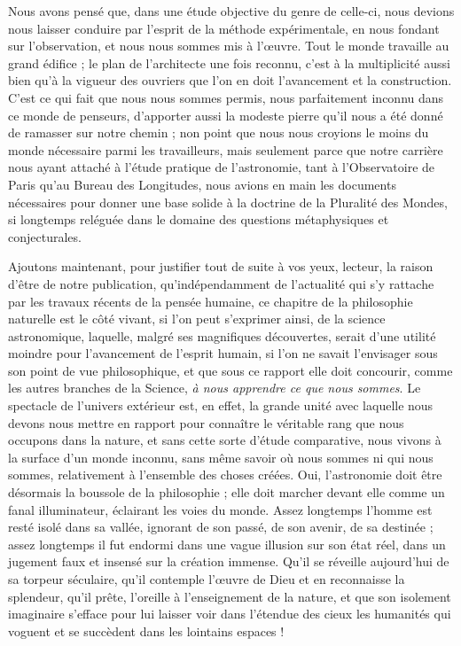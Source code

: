 \documentclass[a4paper, 11pt, oneside, landscape]{article}
\begin{document}
Nous avons pensé que, dans une étude objective du genre de celle-ci, nous devions nous laisser conduire par l'esprit de la méthode expérimentale, en nous fondant sur l'observation, et nous nous sommes mis à l'œuvre. Tout le monde travaille au grand édifice ; le plan de l'architecte une fois reconnu, c'est à la multiplicité aussi bien qu'à la vigueur des ouvriers que l'on en doit l'avancement et la construction. C'est ce qui fait que nous nous sommes permis, nous parfaitement inconnu dans ce monde de penseurs, d'apporter aussi la modeste pierre qu'il nous a été donné de ramasser sur notre chemin ; non point que nous nous croyions le moins du monde nécessaire parmi les travailleurs, mais seulement parce que notre carrière nous ayant attaché à l'étude pratique de l'astronomie, tant à l'Observatoire de Paris qu'au Bureau des Longitudes, nous avions en main les documents nécessaires pour donner une base solide à la doctrine de la Pluralité des Mondes, si longtemps reléguée dans le domaine des questions métaphysiques et conjecturales.

Ajoutons maintenant, pour justifier tout de suite à vos yeux, lecteur, la raison d'être de notre publication, qu'indépendamment de l'actualité qui s'y rattache par les travaux récents de la pensée humaine, ce chapitre de la philosophie naturelle est le côté vivant, si l'on peut s'exprimer ainsi, de la science astronomique, laquelle, malgré ses magnifiques découvertes, serait d'une utilité moindre pour l'avancement de l'esprit humain, si l'on ne savait l'envisager sous son point de vue philosophique, et que sous ce rapport elle doit concourir, comme les autres branches de la Science, \emph{à nous apprendre ce que nous sommes}. Le spectacle de l'univers extérieur est, en effet, la grande unité avec laquelle nous devons nous mettre en rapport pour connaître le véritable rang que nous occupons dans la nature, et sans cette sorte d'étude comparative, nous vivons à la surface d'un monde inconnu, sans même savoir où nous sommes ni qui nous sommes, relativement à l'ensemble des choses créées. Oui, l'astronomie doit être désormais la boussole de la philosophie ; elle doit marcher devant elle comme un fanal illuminateur, éclairant les voies du monde. Assez longtemps l'homme est resté isolé dans sa vallée, ignorant de son passé, de son avenir, de sa destinée ; assez longtemps il fut endormi dans une vague illusion sur son état réel, dans un jugement faux et insensé sur la création immense. Qu'il se réveille aujourd'hui de sa torpeur séculaire, qu'il contemple l'œuvre de Dieu et en reconnaisse la splendeur, qu'il prête, l'oreille à l'enseignement de la nature, et que son isolement imaginaire s'efface pour lui laisser voir dans l'étendue des cieux les humanités qui voguent et se succèdent dans les lointains espaces !
\end{document}
